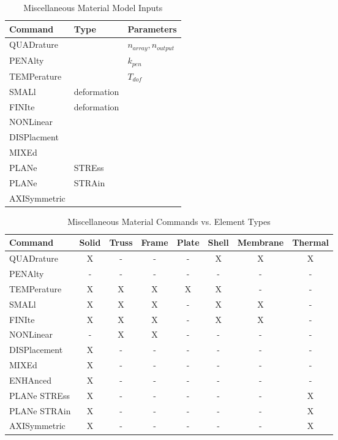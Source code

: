 \begin{table}[ht!]
\begin{center}
\begin{tabular}{| l | l | l |} \hline
Command & Type & Parameters \\ \hline
QUADrature  & {}       & $n_{array}, n_{output}$ \\
PENAlty     &          & $k_{pen}$ \\
TEMPerature & {}       & $T_{dof}$ \\ \hline
SMALl       & deformation & {} \\
FINIte      & deformation & {} \\
NONLinear   & {}       & {} \\ \hline
DISPlacment & {}       & {} \\
MIXEd       & {}       & {} \\
PLANe       & STREss   & {} \\
PLANe       & STRAin   & {} \\
AXISymmetric & {}      & {} \\ \hline
\end{tabular}
\end{center}
\caption{Miscellaneous Material Model Inputs}
\label{tab134a}
\end{table}

\begin{table}[ht!]
\begin{center}
\begin{tabular}{| l | c | c | c | c | c | c | c |} \hline
Command & Solid & Truss & Frame & Plate & Shell & Membrane & Thermal \\ \hline
QUADrature      & X & - & -  & - & X & X & X \\
PENAlty         & - & - & -  & - & - & - & - \\
TEMPerature     & X & X & X  & X & X & - & - \\ \hline
SMALl           & X & X & X  & - & X & X & - \\
FINIte          & X & X & X  & - & X & X & - \\
NONLinear       & - & X & X  & - & - & - & - \\ \hline
DISPlacement    & X & - & -  & - & - & - & - \\
MIXEd           & X & - & -  & - & - & - & - \\
ENHAnced        & X & - & -  & - & - & - & - \\ \hline
PLANe STREss    & X & - & -  & - & - & - & X \\
PLANe STRAin    & X & - & -  & - & - & - & X \\
AXISymmetric    & X & - & -  & - & - & - & X \\ \hline
\end{tabular}
\end{center}
\caption{Miscellaneous Material Commands vs. Element Types}
\label{tab134b}
\end{table}

